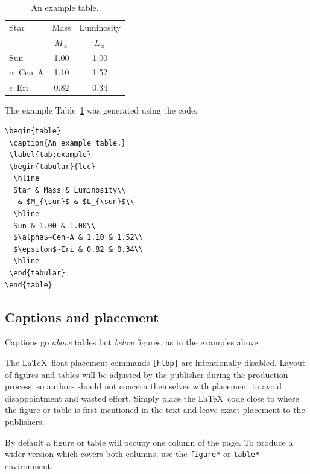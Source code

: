 \documentclass[fleqn,usenatbib,useAMS]{mnras}
\begin{document}
\begin{table}
 \caption{An example table.}
 \label{tab:example}
 \begin{tabular}{lcc}
  \hline
  Star & Mass & Luminosity\\
   & $M_{\sun}$ & $L_{\sun}$\\
  \hline
  Sun & 1.00 & 1.00\\
  $\alpha$~Cen~A & 1.10 & 1.52\\
  $\epsilon$~Eri & 0.82 & 0.34\\
  \hline
 \end{tabular}
\end{table}
The example Table~\ref{tab:example} was generated using the code:
\begin{verbatim}
\begin{table}
 \caption{An example table.}
 \label{tab:example}
 \begin{tabular}{lcc}
  \hline
  Star & Mass & Luminosity\\
   & $M_{\sun}$ & $L_{\sun}$\\
  \hline
  Sun & 1.00 & 1.00\\
  $\alpha$~Cen~A & 1.10 & 1.52\\
  $\epsilon$~Eri & 0.82 & 0.34\\
  \hline
 \end{tabular}
\end{table}
\end{verbatim}

\subsection{Captions and placement}
Captions go \emph{above} tables but \emph{below} figures, as in the examples above.

The \LaTeX\ float placement commands \verb'[htbp]' are intentionally disabled.
Layout of figures and tables will be adjusted by the publisher during the production process, so authors should not concern themselves with placement to avoid disappointment and wasted effort.
Simply place the \LaTeX\ code close to where the figure or table is first mentioned in the text and leave exact placement to the publishers.

By default a figure or table will occupy one column of the page.
To produce a wider version which covers both columns, use the \verb'figure*' or \verb'table*'  environment.
\end{document}
